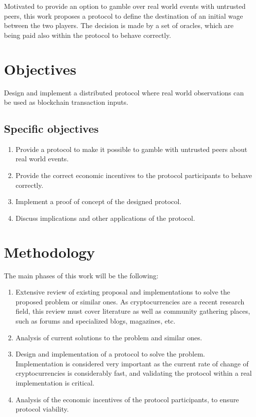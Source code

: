 Motivated to provide an option to gamble over real world events with untrusted
 peers,
this work proposes a protocol to define the destination of an initial wage
  between the two players.
The decision is made by a set of oracles, which are being paid also within the
  protocol to behave correctly.

\section{Objectives}
Design and implement a distributed protocol where real world observations can
  be used as blockchain transaction inputs.

\subsection{Specific objectives}
\begin{enumerate}
	\item Provide a protocol to make it possible to gamble with untrusted peers
	  about real world events.
	\item Provide the correct economic incentives to the protocol participants to
	  behave correctly.
	\item Implement a proof of concept of the designed protocol.
	\item Discuss implications and other applications of the protocol.
\end{enumerate}

\section{Methodology}
The main phases of this work will be the following:
\begin{enumerate}
	\item Extensive review of existing proposal and implementations to solve
	  the proposed problem or similar ones. As cryptocurrencies are a recent
	  research field, this review must cover literature as well as
	  community gathering places, such as forums and specialized blogs,
	  magazines, etc.
  \item Analysis of current solutions to the problem and similar ones.
  \item Design and implementation of a protocol to solve the problem.
    Implementation is considered very important as the current rate of change
    of cryptocurrencies is considerably fast, and validating the protocol within
    a real implementation is critical.
  \item Analysis of the economic incentives of the protocol participants, to
    ensure protocol viability.
\end{enumerate}

